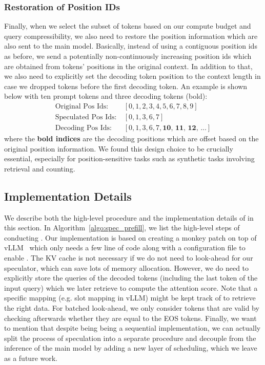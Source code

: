 \subsubsection{Restoration of Position IDs}
\label{sec:position_ids}
Finally, when we select the subset of tokens based on our compute budget and query compressibility, we also need to restore the position information which are also sent to the main model. Basically, instead of using a contiguous position ids as before, we send a potentially non-continuously increasing position ids which are obtained from tokens' positions in the original context. In addition to that, we also need to explicitly set the decoding token position to the context length in case we dropped tokens before the first decoding token. An example is shown below with ten prompt tokens and three decoding tokens (bold): 
\begin{align*}
    \text{Original Pos Ids:}\ &[0, 1, 2, 3, 4, 5, 6, 7, 8, 9] \\
    \text{Speculated Pos Ids:}\ &[0, 1, 3, 6, 7] \\
    \text{Decoding Pos Ids:}\ &[0, 1, 3, 6, 7, \textbf{10, 11, 12, ...}]
\end{align*}
where the \textbf{bold indices} are the decoding positions which are offset based on the original position information. We found this design choice to be crucially essential, especially for position-sensitive tasks such as synthetic tasks involving retrieval and counting. 

\subsection{Implementation Details}

We describe both the high-level procedure and the implementation details of \ours{} in this section. In Algorithm~\ref{algo:spec_prefill}, we list the high-level steps of conducting \ours{}. Our implementation is based on creating a monkey patch on top of vLLM~\cite{li2024snapkvllmknowslooking} which only needs a few line of code along with a configuration file to enable \ours{}. The KV cache is not necessary if we do not need to look-ahead for our speculator, which can save lots of memory allocation. However, we do need to explicitly store the queries of the decoded tokens (including the last token of the input query) which we later retrieve to compute the attention score. Note that a specific mapping (e.g. slot mapping in vLLM) might be kept track of to retrieve the right data. For batched look-ahead, we only consider tokens that are valid by checking afterwards whether they are equal to the EOS tokens. Finally, we want to mention that despite being being a sequential implementation, we can actually split the process of speculation into a separate procedure and decouple from the inference of the main model by adding a new layer of scheduling, which we leave as a future work. 

